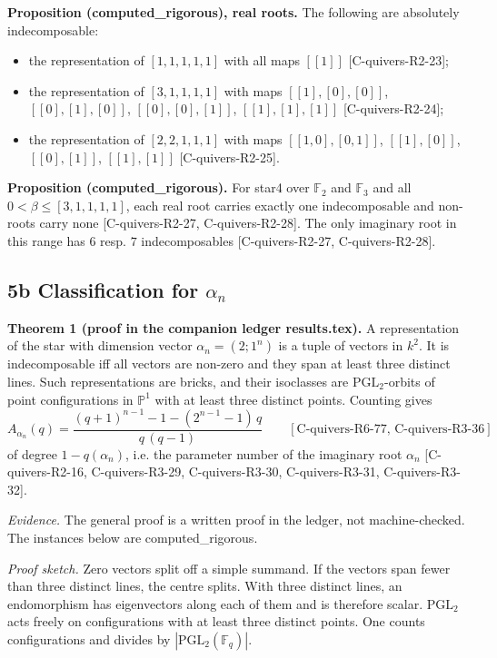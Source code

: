 \documentclass[10pt,twocolumn]{article}
\begin{document}
\textbf{Proposition (computed\_rigorous), real roots.} The following are absolutely indecomposable:
\begin{itemize}
\item the representation of $[1, 1, 1, 1, 1]$ with all maps $[[1]]$ {\scriptsize[C-quivers-R2-23]};
\item the representation of $[3, 1, 1, 1, 1]$ with maps $[[1], [0], [0]]$, $[[0], [1], [0]]$, $[[0], [0], [1]]$, $[[1], [1], [1]]$ {\scriptsize[C-quivers-R2-24]};
\item the representation of $[2, 2, 1, 1, 1]$ with maps $[[1, 0], [0, 1]]$, $[[1], [0]]$, $[[0], [1]]$, $[[1], [1]]$ {\scriptsize[C-quivers-R2-25]}.
\end{itemize}

\textbf{Proposition (computed\_rigorous).} For star4 over $\mathbb F_2$ and $\mathbb F_3$ and all $0<\beta\le[3, 1, 1, 1, 1]$, each real root carries exactly one indecomposable and non-roots carry none {\scriptsize[C-quivers-R2-27, C-quivers-R2-28]}. The only imaginary root in this range has $6$ resp. $7$ indecomposables {\scriptsize[C-quivers-R2-27, C-quivers-R2-28]}.

\subsection*{5b Classification for $\alpha_n$}

\textbf{Theorem 1 (proof in the companion ledger results.tex).} A representation of the star with dimension vector $\alpha_n=(2;1^n)$ is a tuple of vectors in $k^2$. It is indecomposable iff all vectors are non-zero and they span at least three distinct lines. Such representations are bricks, and their isoclasses are $\mathrm{PGL}_2$-orbits of point configurations in $\mathbb P^1$ with at least three distinct points. Counting gives
$$A_{\alpha_n}(q)=\frac{(q+1)^{n-1} - 1 - (2^{n-1} - 1)\,q}{q\,(q-1)}\qquad [\text{C-quivers-R6-77, C-quivers-R3-36}]$$
of degree $1-q(\alpha_n)$, i.e. the parameter number of the imaginary root $\alpha_n$ {\scriptsize[C-quivers-R2-16, C-quivers-R3-29, C-quivers-R3-30, C-quivers-R3-31, C-quivers-R3-32]}.

\emph{Evidence.} The general proof is a written proof in the ledger, not machine-checked. The instances below are computed\_rigorous.

\emph{Proof sketch.} Zero vectors split off a simple summand. If the vectors span fewer than three distinct lines, the centre splits. With three distinct lines, an endomorphism has eigenvectors along each of them and is therefore scalar. $\mathrm{PGL}_2$ acts freely on configurations with at least three distinct points. One counts configurations and divides by $|\mathrm{PGL}_2(\mathbb F_q)|$.
\end{document}
